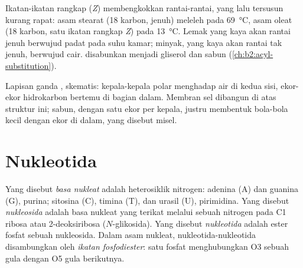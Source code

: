 Ikatan-ikatan rangkap (\textit{Z}) membengkokkan rantai-rantai, yang lalu
tersusun kurang rapat: asam stearat (18 karbon, jenuh) meleleh pada
\qty{69}{\degreeCelsius}, asam oleat (18 karbon, satu ikatan rangkap
\textit{Z}) pada
\qty{13}{\degreeCelsius}. Lemak yang kaya akan rantai jenuh berwujud padat
pada suhu kamar; minyak, yang kaya akan rantai tak jenuh, berwujud cair.
 disabunkan menjadi gliserol dan sabun
(\cref{ch:b2:acyl-substitution}).

\begin{omfigure}
\par\vspace{4pt}

{\small Lapisan ganda , skematis: kepala-kepala polar menghadap air
di kedua sisi, ekor-ekor hidrokarbon bertemu di bagian dalam. Membran sel
dibangun di atas struktur ini; sabun, dengan satu ekor per kepala, justru
membentuk bola-bola kecil dengan ekor di dalam, yang disebut misel.}
\end{omfigure}

\section{Nukleotida}

\begin{definition}[Nukleotida]\label{def:b2:biomolecules:nucleotide}
Yang disebut \emph{basa nukleat} adalah heterosiklik
nitrogen: adenina (A) dan guanina (G), purina; sitosina (C), timina (T), dan
urasil (U), pirimidina. Yang disebut \emph{nukleosida}
adalah basa nukleat yang terikat melalui sebuah nitrogen pada C1 ribosa atau
2-deoksiribosa ($N$-glikosida). Yang disebut
\emph{nukleotida} adalah ester fosfat sebuah nukleosida.
Dalam asam nukleat, nukleotida-nukleotida disambungkan oleh \emph{ikatan
fosfodiester}: satu fosfat menghubungkan O3
sebuah gula dengan O5 gula berikutnya.
\end{definition}

